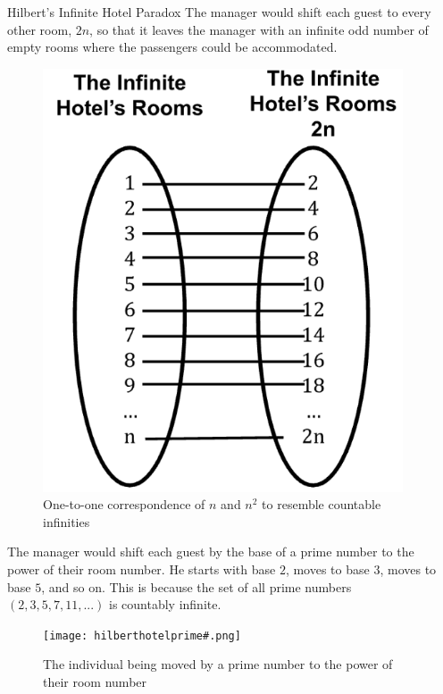 \documentclass[final]{beamer}
\newlength{\sepwidth}
\newlength{\colwidth}
\newcommand{\separatorcolumn}{\begin{column}{\sepwidth}\end{column}}
\begin{document}
\begin{frame}[t]
\begin{columns}[t]
\begin{column}{\colwidth}
\begin{exampleblock}{Hilbert's Infinite Hotel Paradox}
    The manager would shift each guest to every other room, $2n$, so that it leaves the manager with an infinite odd number of empty rooms where the passengers could be accommodated.
    \begin{figure}
        \centering
        \includegraphics[width=0.4\linewidth]{hilberthotel_2n.png}
        \caption{One-to-one correspondence of $n$ and $n^2$ to resemble countable infinities}
        \label{fig:enter-label}
    \end{figure}


    The manager would shift each guest by the base of a prime number to the power of their room number. He starts with base $2$, moves to base $3$, moves to base $5$, and so on. This is because the set of all prime numbers $(2,3,5,7,11,...)$ is countably infinite.
\begin{figure}
    \centering
    \texttt{[image: hilberthotelprime\#.png]}
    \caption{The individual being moved by a prime number to the power of their room number}
    \label{fig:enter-label}
\end{figure}
  \end{exampleblock}

\end{column}

\separatorcolumn
\end{columns}
\end{frame}
\end{document}

